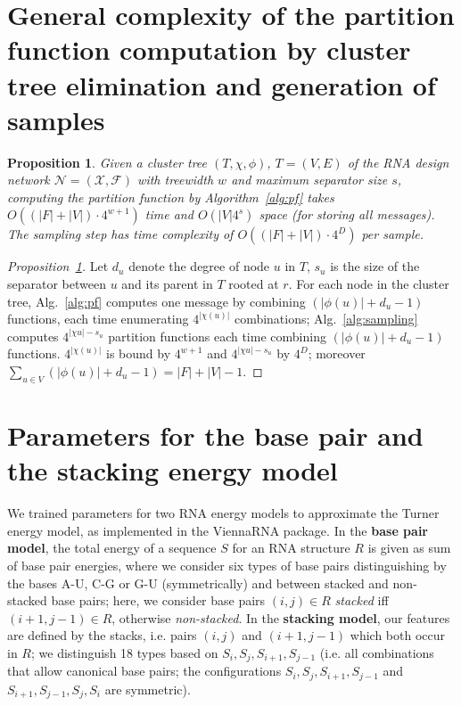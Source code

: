 \documentclass{bioinfo}
\newtheorem{proposition}[theorem]{Proposition}
\newcommand{\network}{\mathcal{N}}
\newcommand{\F}{\mathcal{F}}
\newcommand{\X}{\mathcal{X}}
\newcommand{\Def}[1]{{\bf #1}}
\newcommand{\Software}[1]{{\ttfamily #1}}
\begin{document}
\section{General complexity of the partition function computation by cluster tree elimination and generation of samples}
\label{appsec:algcomplexity}

\begin{proposition}
  \label{prop:general-complexity}
Given a cluster tree $(T,\chi,\phi)$, $T=(V,E)$ of the RNA design network $\network=(\X,\F)$ with treewidth $w$ and maximum separator size $s$, computing the partition function by Algorithm~\ref{alg:pf} takes $O((|F|+|V|)\cdot 4^{w+1})$ time and $O(|V| 4^s)$ space (for storing all messages). The sampling step has time complexity of $O((|F|+|V|)\cdot 4^D)$ per sample.
\end{proposition}

\begin{proof}[Proposition~\ref{prop:general-complexity}]
Let $d_u$ denote the degree of node $u$ in $T$, $s_u$ is the size of the separator between 
$u$ and its parent in $T$ rooted at $r$. For each node in the cluster tree, Alg.~\ref{alg:pf} computes one message by combining $(|\phi(u)|+d_u-1)$ functions, each time enumerating $4^{|\chi(u)|}$ combinations; Alg.~\ref{alg:sampling} computes $4^{|\chi{u}|-s_u}$ partition functions each time combining $(|\phi(u)|+d_u-1)$ functions.  $4^{|\chi(u)|}$ is bound by $4^{w+1}$ and $4^{|\chi{u}|-s_u}$ by $4^D$; moreover $\sum_{u\in V} (|\phi(u)|+d_u-1) = |F|+|V|-1$.
\end{proof}

\section{Parameters for the base pair and the stacking energy model}
\label{appsec:modelparameters}

We trained parameters for two RNA energy models to approximate the
Turner energy model, as implemented in the \Software{ViennaRNA}
package.  In the \Def{base pair model}, the total energy of a sequence $S$
for an RNA structure $R$ is given as sum of base pair energies, where
we consider six types of base pairs distinguishing by the bases A-U,
C-G or G-U (symmetrically) and between stacked and non-stacked base
pairs; here, we consider base pairs $(i,j)\in R$ \emph{stacked} iff
$(i+1,j-1)\in R$, otherwise \emph{non-stacked}. In the \Def{stacking model},
our features are defined by the stacks, i.e. pairs $(i,j)$ and
$(i+1,j-1)$ which both occur in $R$; we distinguish 18 types based on
$S_i,S_j,S_{i+1},S_{j-1}$ (i.e. all combinations that allow canonical
base pairs; the configurations $S_i,S_j,S_{i+1},S_{j-1}$ and
$S_{i+1},S_{j-1},S_j,S_i$ are symmetric).
\end{document}
